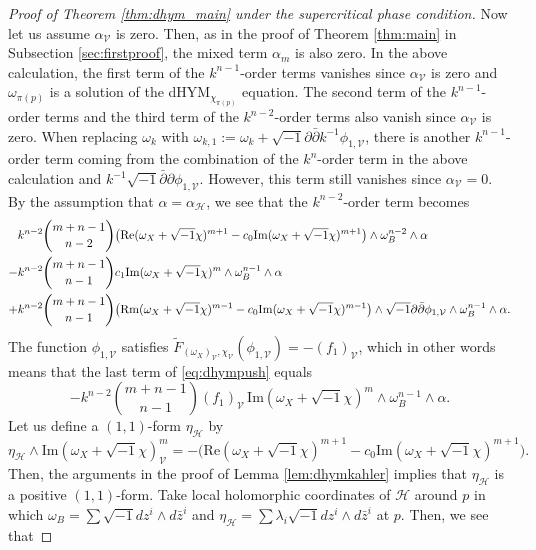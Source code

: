 \documentclass{amsart}
\numberwithin{equation}{section}
\theoremstyle{plain}
\theoremstyle{definition}
\theoremstyle{remark}
\begin{document}
\begin{proof}[Proof of Theorem \ref{thm:dhym_main} under the supercritical phase condition]
    Now let us assume $\alpha_{\mathcal{V}}$ is zero. 
    Then, as in the proof of Theorem \ref{thm:main} in Subsection \ref{sec:firstproof}, the mixed term $\alpha_m$ is also zero.  
    In the above calculation, the first term of the $k^{n-1}$-order terms vanishes since $\alpha_{\mathcal{V}}$ is zero and $\omega_{\pi(p)}$ is a solution of the dHYM$_{\chi_{\pi(p)}}$ equation. The second term of the $k^{n-1}$-order terms and the third term of the $k^{n-2}$-order terms also vanish since $\alpha_{\mathcal{V}}$ is zero. 
    When replacing $\omega_{k}$ with $\omega_{k,1}:=\omega_k+\sqrt{-1}\partial\bar{\partial}k^{-1}\phi_{1,\mathcal{V}}$, there is another $k^{n-1}$-order term coming from the combination of the $k^n$-order term in the above calculation and $k^{-1}\sqrt{-1}\bar{\partial}\partial\phi_{1,\mathcal{V}}$. However, this term still vanishes since $\alpha_\mathcal{V}=0$.
    By the assumption that $\alpha=\alpha_{\mathcal{H}}$, we see that the $k^{n-2}$-order term becomes
    \begin{align}\label{eq:dhympush}
        &k^{n-2}{{m+n-1}\choose n-2} \big(\mathrm{Re}(\omega_X+\sqrt{-1}\chi)^{m+1}-c_0\mathrm{Im}(\omega_X+\sqrt{-1}\chi)^{m+1}\big)\wedge\omega_B^{n-2}\wedge\alpha\\
        -&k^{n-2} {{m+n-1}\choose n-1} c_1\mathrm{Im}(\omega_X+\sqrt{-1}\chi)^m\wedge\omega_B^{n-1}\wedge\alpha\notag\\
        +&k^{n-2}{m+n-1\choose n-1} \big(\mathrm{Rm}(\omega_X+\sqrt{-1}\chi)^{m-1} -c_0\mathrm{Im}(\omega_X+\sqrt{-1}\chi)^{m-1}\big)\wedge\sqrt{-1}\partial\bar{\partial}\phi_{1,\mathcal{V}}\wedge\omega_B^{n-1}\wedge\alpha\notag.
    \end{align}
    The function $\phi_{1,\mathcal{V}}$ satisfies $\tilde{F}_{(\omega_{X})_\mathcal{V},\chi_{\mathcal{V}}}(\phi_{1,\mathcal{V}})=-(f_1)_{\mathcal{V}}$, which in other words means that the last term of \eqref{eq:dhympush} equals 
    $$-k^{n-2}{m+n-1\choose n-1}(f_1)_{\mathcal{V}}\, \mathrm{Im}(\omega_X+\sqrt{-1}\chi)^m\wedge\omega_B^{n-1}\wedge\alpha.$$ 
    Let us define a $(1,1)$-form $\eta_\mathcal{H}$ by $$\eta_\mathcal{H}\wedge\mathrm{Im}(\omega_X+\sqrt{-1}\chi)_{\mathcal{V}}^m=-\big(\mathrm{Re}(\omega_X+\sqrt{-1}\chi)^{m+1}-c_0\mathrm{Im}(\omega_X+\sqrt{-1}\chi)^{m+1}\big).$$
    Then, the arguments in the proof of Lemma \ref{lem:dhymkahler} implies that $\eta_\mathcal{H}$ is a positive $(1,1)$-form.
    Take local holomorphic coordinates of $\mathcal{H}$ around $p$ in which $\omega_B=\sum\sqrt{-1}dz^i\wedge d\bar{z}^i$ and $\eta_{\mathcal{H}}=\sum\lambda_i\sqrt{-1}dz^i\wedge d\bar{z}^i$ at $p$. Then, we see that

\end{proof}
\end{document}
